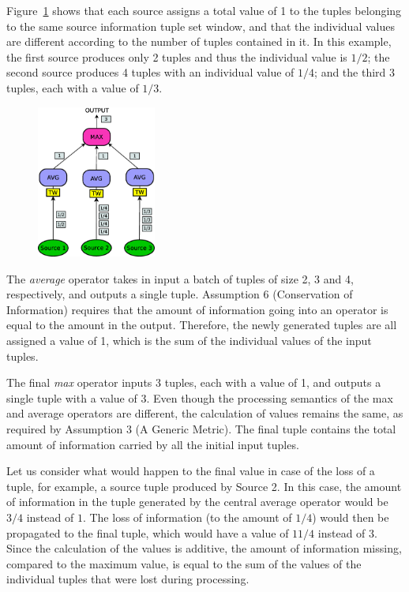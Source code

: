 Figure~\ref{fig:query_fanin2} shows that
each source assigns a total value of 1 to the tuples belonging to the same source information tuple set window, and
that the individual \sic values are different according to the number of tuples contained in it. In this
example, the first source produces only 2 tuples and thus the individual \sic value is $1/2$; the second
source produces 4 tuples with an individual value of $1/4$; and the third 3 tuples, each with a value of
$1/3$.
\DIFaddbegin \begin{figure}[h] \centering \includegraphics[width=0.35\textwidth]{img/tesi/query_fanin} \caption{}
\label{fig:query_fanin2}
\end{figure}
\DIFaddend 

The \textit{average} operator takes in input a batch of tuples of size 2, 3 and 4, respectively, and
outputs a single tuple. Assumption 6 (Conservation of Information) requires that the amount of
information going into an operator is equal to the amount in the output. Therefore, the newly generated
tuples are all assigned a \sic value of 1, which is the sum of the individual \sic values of the input
tuples.

The final \textit{max} operator inputs 3 tuples, each with a \sic value of 1, and outputs a single
tuple with a \sic value of 3. Even though the processing semantics of the max and average operators are
different, the calculation of \sic values remains the same, as required by Assumption 3 (A Generic
Metric).
The final tuple contains the total amount of information carried by all the initial input tuples. 

Let us consider what would happen to the final \sic value in case of the loss of a tuple, for example, a
source tuple produced by Source 2. In this case, the amount of information in the tuple generated by the
central average operator would be $3/4$ instead of $1$. The loss of information (\ie to the amount
of $1/4$) would then be propagated to the final tuple, which would have a \sic value of $11/4$ instead of
$3$.
Since the calculation of the \sic values is additive, the amount of information missing, compared to
the maximum value, is equal to the sum of the \sic values of the individual tuples that
were lost during processing.


